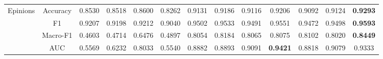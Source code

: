 \documentclass[runningheads]{llncs}
\begin{document}
\begin{table}[!ht]
{\begin{tabular}{c|c|c|ccc|ccc|c|ccc}
\multirow{4}{*}{Epinions}      & Accuracy & 0.8530 & 0.8518 & 0.8600 & 0.8262 & 0.9131 & 0.9186 & 0.9116 & 0.9206 & 0.9092 & 0.9124 & \textbf{0.9293} \\
                              & F1 & 0.9207 & 0.9198 & 0.9212 & 0.9040 & 0.9502 & 0.9533 & 0.9491 & 0.9551 & 0.9472 & 0.9498 & \textbf{0.9593} \\
                              & Macro-F1 & 0.4603 & 0.4714 & 0.6476 & 0.4897 & 0.8054 & 0.8184 & 0.8065 & 0.8075 & 0.8102 & 0.8020 & \textbf{0.8449} \\
                              & AUC & 0.5569 & 0.6232 & 0.8033 & 0.5540 & 0.8882 & 0.8893 & 0.9091 & \textbf{0.9421} & 0.8818 & 0.9079 & 0.9333 \\ \hline
\end{tabular}
}
\end{table}
\end{document}
